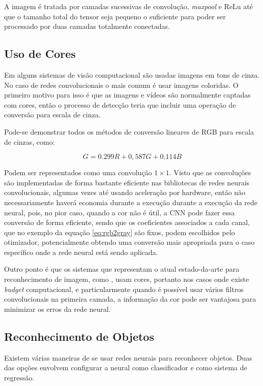 A imagem é tratada por camadas sucessivas de convolução, \emph{maxpool} e
ReLu até que
o tamanho total do tensor seja pequeno o suficiente para poder ser processado
por duas camadas totalmente conectadas. 

\subsection{Uso de Cores}
Em alguns sistemas de visão computacional são usadas imagens em
tons de cinza. No caso de redes convolucionais o mais comum é usar
imagens coloridas.
O primeiro motivo para isso é que as imagens e vídeos são normalmente
captadas com cores, então o processo de detecção teria que incluir uma operação
de conversão para escala de cinza. 

Pode-se demonstrar todos os métodos de conversão lineares de RGB para escala de
cinzas, como:

\begin{equation} \label{eq:rgb2gray}
	G=0.299R + 0,587G + 0.114B
\end{equation}

Podem ser representados como uma convolução $1 \times 1$. Visto que as
convoluções são implementadas de forma bastante eficiente nas bibliotecas
de redes neurais convolucionais, algumas vezes até usando aceleração por
hardware, então não necessariamente haverá economia durante a execução
durante a execução da rede neural, pois, no pior caso, quando a cor não
é útil, a CNN pode fazer
essa conversão de forma eficiente, sendo que os coeficientes associados
a cada canal, que no exemplo da equação \ref{eq:rgb2gray} são fixos, podem
escolhidos pelo otimizador, potencialmente obtendo uma conversão mais
apropriada para o caso específico onde a rede neural está sendo aplicada.

Outro ponto é que os sistemas que representam o atual
estado-da-arte para reconhecimento de imagem, como \cite{szegedy2015going}
\cite{hasanpour2016lets}, usam cores, portanto nos casos onde
existe \emph{budget} computacional, e particularmente quando é possível usar
vários filtros convolucionais na primeira camada, a informação da cor pode
ser vantajosa para minimizar os erros da rede neural.

\subsection{Reconhecimento de Objetos}
Existem várias maneiras de se usar redes neurais para reconhecer objetos. Duas
das opções envolvem configurar a neural como classificador e como sistema de
regressão.

